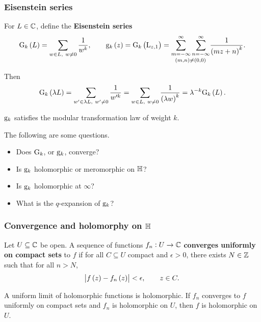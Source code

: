 \subsubsection{Eisenstein series}


\begin{definition}
For $ L \in \mathbb{C} $, define the \textbf{Eisenstein series}
$$ \G_k\br{L} = \sum_{w \in L, \ w \ne 0} \dfrac{1}{w^k}, \qquad \g_k\br{z} = \G_k\br{\L_{z, 1}} = \underset{\br{m, n} \ne \br{0, 0}}{\sum_{m = -\infty}^\infty \sum_{n = -\infty}^\infty} \dfrac{1}{\br{mz + n}^k}. $$
\end{definition}

Then
$$ \G_k\br{\lambda L} = \sum_{w' \in \lambda L, \ w' \ne 0} \dfrac{1}{w'^k} = \sum_{w \in L, \ w \ne 0} \dfrac{1}{\br{\lambda w}^k} = \lambda^{-k}\G_k\br{L}. $$

\begin{corollary}
$ \mathrm{g}_k $ satisfies the modular transformation law of weight $ k $.
\end{corollary}

The following are some questions.
\begin{itemize}
\item Does $ \mathrm{G}_k $, or $ \mathrm{g}_k $, converge?
\item Is $ \mathrm{g}_k $ holomorphic or meromorphic on $ \mathbb{H} $?
\item Is $ \mathrm{g}_k $ holomorphic at $ \infty $?
\item What is the $ q $-expansion of $ \mathrm{g}_k $?
\end{itemize}

\subsubsection{Convergence and holomorphy on \texorpdfstring{$ \mathbb{H} $}{H}}

\begin{definition}
Let $ U \subseteq \mathbb{C} $ be open. A sequence of functions $ f_n : U \to \mathbb{C} $ \textbf{converges uniformly on compact sets} to $ f $ if for all $ C \subseteq U $ compact and $ \epsilon > 0 $, there exists $ N \in \mathbb{Z} $ such that for all $ n > N $,
$$ \abs{f\br{z} - f_n\br{z}} < \epsilon, \qquad z \in C. $$
\end{definition}

\begin{theorem}
A uniform limit of holomorphic functions is holomorphic. If $ f_n $ converges to $ f $ uniformly on compact sets and $ f_n $ is holomorphic on $ U $, then $ f $ is holomorphic on $ U $.
\end{theorem}

